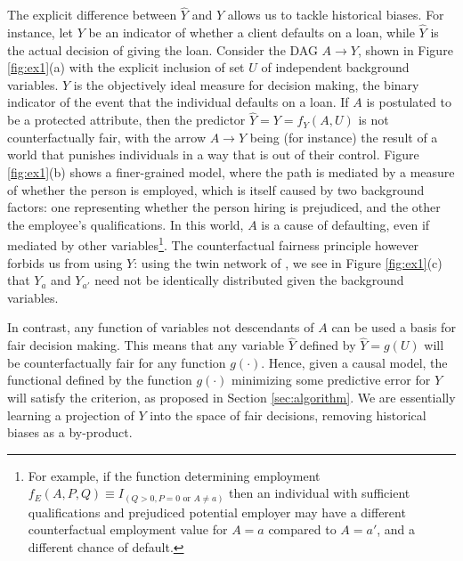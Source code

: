  The explicit difference
between $\hat Y$ and $Y$ allows us to tackle historical biases. For
instance, let $Y$ be an indicator of whether a client defaults on a
loan, while $\hat Y$ is the actual decision of giving the
loan. Consider the DAG $A \rightarrow Y$, shown in Figure
\ref{fig:ex1}(a) with the explicit inclusion of set $U$ of independent
background variables. $Y$ is the objectively ideal measure for
decision making, the binary indicator of the event that the individual defaults on
a loan. If $A$ is postulated to be a protected attribute, then the
predictor $\hat Y = Y = f_Y(A, U)$ is not counterfactually fair, with the arrow $A
\rightarrow Y$ being (for instance) the result of a world that
punishes individuals in a way that is out of their control. Figure
\ref{fig:ex1}(b) shows a finer-grained model, where the path is
mediated by a measure of whether the person is employed, which is
itself caused by two background factors: one representing whether the
person hiring is prejudiced, and the other the employee's
qualifications. In this world, $A$ is a cause of defaulting, even if
mediated by other variables\footnote{For example, if the function
  determining employment $f_E(A,P,Q) \equiv I_{(Q > 0, P = 0 \text{ or } A
    \neq a)}$ then an individual with sufficient qualifications and
  prejudiced potential employer may have a different counterfactual
  employment value for $A = a$ compared to $A = a'$, and a different
  chance of default. }. The counterfactual fairness principle however
forbids us from using $Y$: using the twin network of \citet{pearl:00},
we see in Figure \ref{fig:ex1}(c) that $Y_a$ and $Y_{a'}$ need not be
identically distributed given the background variables.

In contrast, any function of variables not descendants of $A$ can be
used a basis for fair decision making. This means that any variable
$\hat Y$ defined by $\hat Y = g(U)$ will be counterfactually fair for
any function $g(\cdot)$. Hence, given a causal model, the functional
defined by the function $g(\cdot)$ minimizing some predictive error
for $Y$ will satisfy the criterion, as proposed in Section
\ref{sec:algorithm}. We are essentially learning a projection of $Y$
into the space of fair decisions, removing historical biases as a
by-product.

